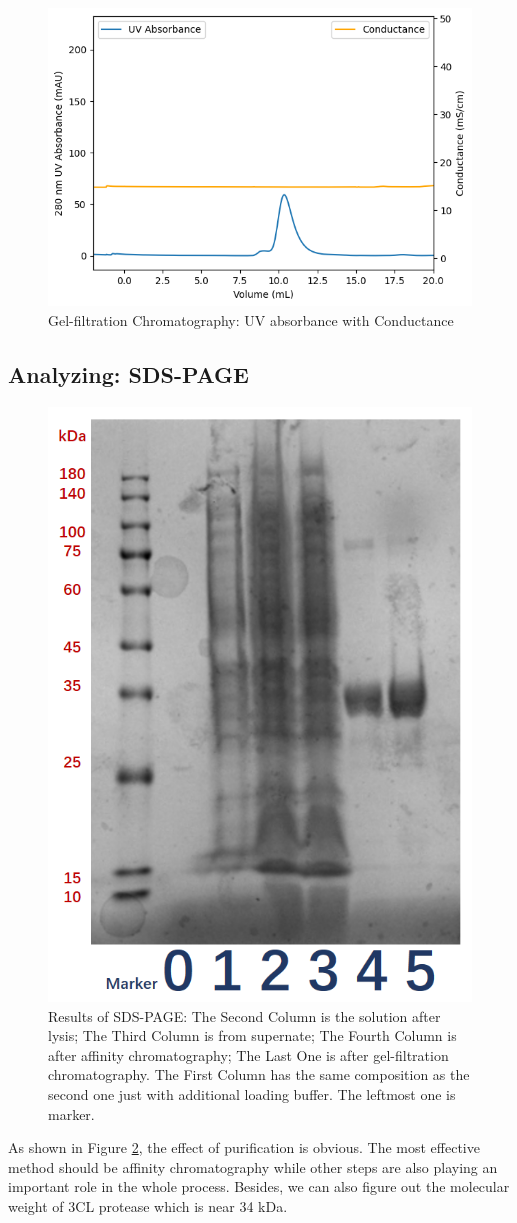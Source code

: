 \documentclass{report}
\begin{document}
\begin{figure}
    \centering
    \includegraphics[width=0.6\linewidth]{../Figures/Filtration Column UV and Conductance.png}
    \caption{Gel-filtration Chromatography: UV absorbance with Conductance}
    \label{Gel-filtration Chromatography: UV absorbance with Conductace}
\end{figure}


\subsection{Analyzing: SDS-PAGE}
\begin{figure}
    \centering
    \includegraphics[width=0.7\linewidth]{../Figures/SDS-PAGE.png}
    \caption{Results of SDS-PAGE: The Second Column is the solution after lysis; The Third Column is from supernate; The Fourth Column is after affinity chromatography; The Last One is after gel-filtration chromatography. The First Column has the same composition as the second one just with additional loading buffer. The leftmost one is marker.}
    \label{Results of SDS-PAGE}
\end{figure}
As shown in Figure \ref{Results of SDS-PAGE}, the effect of purification is obvious.
The most effective method should be affinity chromatography while other steps are also playing an important role in the whole process.
Besides, we can also figure out the molecular weight of 3CL protease which is near 34 kDa.
\end{document}
